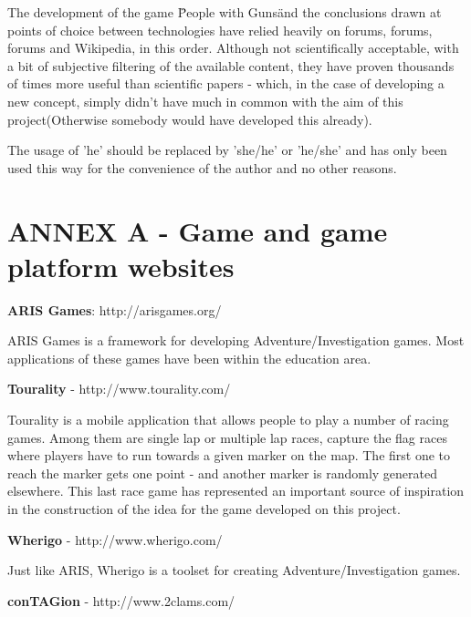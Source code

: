 \documentclass{article}
\begin{document}
The development of the game \"People with Guns\" and the conclusions drawn at
points of choice between technologies have relied heavily on forums, forums,
forums and Wikipedia, in this order. Although not scientifically acceptable,
with a bit of subjective filtering of the available content, they have proven
thousands of times more useful than scientific papers - which, in the case of
developing a new concept, simply didn't have much in common with the aim of this
project(Otherwise somebody would have developed this already).

The usage of 'he' should be replaced by 'she/he' or 'he/she' and has only been
used this way for the convenience of the author and no other reasons.


\section{ANNEX A - Game and game platform websites}



\nocite{teamtags}
\nocite{gps1}



\textbf{ARIS Games}: http://arisgames.org/\newline

ARIS Games is a framework for developing Adventure/Investigation games. Most
applications of these games have been within the education area.\newline

\textbf{Tourality} - http://www.tourality.com/\newline

Tourality is a mobile application that allows people to play a number of racing
games. Among them are single lap or multiple lap races, capture the flag races
where players have to run towards a given marker on the map. The first one to
reach the marker gets one point - and another marker is randomly generated
elsewhere. This last race game has represented an important source of
inspiration in the construction of the idea for the game developed on this
project.\newline

\textbf{Wherigo} - http://www.wherigo.com/\newline

Just like ARIS, Wherigo is a toolset for creating Adventure/Investigation games.
\newline

\textbf{conTAGion} - http://www.2clams.com/\newline
\end{document}

